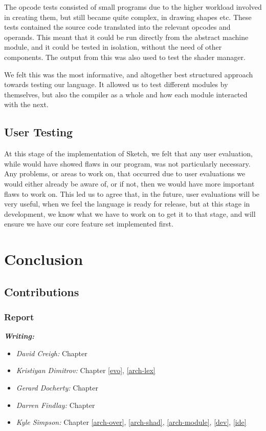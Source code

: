 \documentclass{l3proj}
\begin{document}
The opcode tests consisted of small programs due to the higher workload involved in creating them, but still became quite complex, in drawing shapes etc. These tests contained the source code translated into the relevant opcodes and operands. This meant that it could be run directly from the abstract machine module, and it could be tested in isolation, without the need of other components. The output from this was also used to test the shader manager.

We felt this was the most informative, and altogether best structured approach towards testing our language. It allowed us to test different modules by themselves, but also the compiler as a whole and how each module interacted with the next.

\section{User Testing}
At this stage of the implementation of Sketch, we felt that any user evaluation, while would have showed flaws in our program, was not particularly necessary. Any problems, or areas to work on, that occurred due to user evaluations we would either already be aware of, or if not, then we would have more important flaws to work on. This led us to agree that, in the future, user evaluations will be very useful, when we feel the language is ready for release, but at this stage in development, we know what we have to work on to get it to that stage, and will ensure we have our core feature set implemented first.
\chapter{Conclusion}
\label{conc}

\section{Contributions}
\label{cont}

\subsection{Report}
\label{cont-report}

\textit{\textbf{Writing:}}
\begin{itemize}
\item \emph{David Creigh:} Chapter
\item \emph{Kristiyan Dimitrov:} Chapter \ref{evo}, \ref{arch-lex}
\item \emph{Gerard Docherty:} Chapter 
\item \emph{Darren Findlay:} Chapter 
\item \emph{Kyle Simpson:} Chapter \ref{arch-over}, \ref{arch-shad}, \ref{arch-module}, \ref{dev}, \ref{ide}
\end{itemize}
\end{document}

